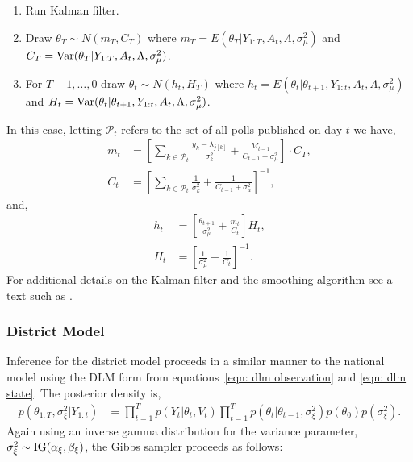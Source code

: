 \documentclass[12pt,final,fleqn]{article}
\theoremstyle{plain}
\newcommand\var{{\rm Var}}
\begin{document}
\begin{enumerate}
\begin{enumerate}
\item Run Kalman filter.
\item Draw $\theta_T \sim N(m_T, C_T)$ where $m_T = E(\theta_T|Y_{1:T}, A_t, \Lambda, \sigma^2_\mu)$ and $C_T = \var(\theta_T | Y_{1:T}, A_t, \Lambda, \sigma^2_\mu)$.
\item For $T-1, \ldots, 0$ draw $\theta_t \sim N(h_t, H_T)$ where $h_t = E(\theta_t|\theta_{t+1}, Y_{1:t}, A_t, \Lambda, \sigma^2_\mu)$ and $H_t = \var(\theta_t|\theta_{t+1}, Y_{1:t}, A_t, \Lambda, \sigma^2_\mu)$.
\end{enumerate}
In this case, letting $\mathcal{P}_t$ refers to the set of all polls published on day $t$ we have,
\begin{align}
m_t &= \left[\sum_{k \in \mathcal{P}_t} \frac{y_k - \lambda_{j[k]}}{\sigma^2_k} + \frac{M_{t-1}}{C_{t-1} + \sigma^2_\mu}\right]\cdot C_T,\\
C_t &= \left[\sum_{k \in \mathcal{P}_t} \frac{1}{\sigma^2_k} + \frac{1}{C_{t-1} + \sigma^2_\mu} \right]^{-1},
\end{align}
and,
\begin{align}
h_t &= \left[\frac{\theta_{t+1}}{\sigma^2_\mu}+ \frac{m_t}{C_t}\right]H_t, \\
H_t &= \left[\frac{1}{\sigma^2_\mu} + \frac{1}{C_t}\right]^{-1}.
\end{align}
For additional details on the Kalman filter and the smoothing algorithm see a text such as \citet{west1997bayesian}.
\end{enumerate}

\subsubsection{District Model}
Inference for the district model proceeds in a similar manner to the national model using the DLM form from equations~\ref{eqn: dlm observation} and \ref{eqn: dlm state}. The posterior density is,
\begin{align}
p(\theta_{1:T}, \sigma^2_{\xi}|Y_{1:t}) &= \prod_{t=1}^T p(Y_t|\theta_t, V_t)\prod_{t=1}^T p(\theta_t|\theta_{t-1}, \sigma^2_\xi) p(\theta_0) p(\sigma^2_\xi).
\end{align}
Again using an inverse gamma distribution for the variance parameter, $\sigma^2_\xi \sim \rm{IG}(\alpha_\xi, \beta_\xi)$, the Gibbs sampler proceeds as follows:
\end{document}

